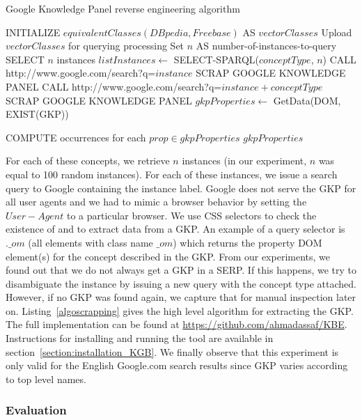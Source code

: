 \begin{algorithm}[ht]\scriptsize
\caption{Google Knowledge Panel reverse engineering algorithm} \label{algoscrapping}
\begin{algorithmic}[1]
    \STATE INITIALIZE $equivalentClasses(DBpedia,Freebase) $ AS $vectorClasses$
    \STATE Upload $vectorClasses$ for querying processing
    \STATE Set $n$ AS number-of-instances-to-query
	\STATE SELECT $n$ instances
	\STATE $listInstances \leftarrow$ SELECT-SPARQL($conceptType$, $n$)
			\STATE CALL http://www.google.com/search?q=$instance$
				\STATE SCRAP GOOGLE KNOWLEDGE PANEL
			\ELSE
				\STATE CALL http://www.google.com/search?q=$instance + conceptType$
 				\STATE SCRAP GOOGLE KNOWLEDGE PANEL
			\ENDIF
			\STATE $gkpProperties \leftarrow$ GetData(DOM, EXIST(GKP))

		\ENDFOR
	\STATE COMPUTE occurrences for each $prop \in gkpProperties$
    \ENDFOR
    \STATE $gkpProperties$
\end{algorithmic}
\end{algorithm}

\normalsize
For each of these concepts, we retrieve $n$ instances (in our experiment, $n$ was equal to 100 random instances). For each of these instances, we issue a search query to Google containing the instance label. Google does not serve the GKP for all user agents and we had to mimic a browser behavior by setting the $User-Agent$ to a particular browser. We use CSS selectors to check the existence of and to extract data from a GKP. An example of a query selector is $.\_om$ (all elements with class name $\_om$) which returns the property DOM element(s) for the concept described in the GKP. From our experiments, we found out that we do not always get a GKP in a SERP. If this happens, we try to disambiguate the instance by issuing a new query with the concept type attached. However, if no GKP was found again, we capture that for manual inspection later on. Listing~\ref{algoscrapping} gives the high level algorithm for extracting the GKP. The full implementation can be found at \url{https://github.com/ahmadassaf/KBE}. Instructions for installing and running the tool are available in section~\ref{section:installation_KGB}. We finally observe that this experiment is only valid for the English Google.com search results since GKP varies according to top level names.

\subsubsection{Evaluation}

